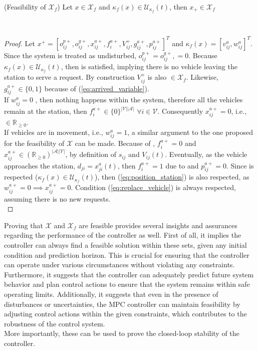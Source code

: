 \begin{proposition}{(Feasibility of $\mathcal{X}_f$)}\label{pro:feas_xf}
	Let $x \in \mathcal{X}_f$ and $\kappa_f(x) \in \mathcal{U}_{\kappa_f}(t)$, then $x_+\in \mathcal{X}_f$
\end{proposition}\\

\begin{proof}
 Let $x^+ = [o_{ij}^{p+}, o_{ij}^{g+}, x_{ij}^{a+}, f^{a+}_{i}, V_{ij}^{+}, g^{a+}_{ij}, p^{a+}_{ij}]^T$ and $\kappa_f(x) = [v^{a}_{ij}, w^{a}_{ij}]^T$. Since the system is treated as undisturbed, $o_{ij}^{p+}= o_{ij}^{g+},=0$. Because $\kappa_f(x) \in \mathcal{U}_{\kappa_f}(t)$, then  is satisfied, implying there is no vehicle leaving the station to serve a request. By construction $V_{ij}^{+}$ is also $\in \mathcal{X}_f$. Likewise, $g^{a+}_{ij}\in \{0,1\}$ because of (\ref{eq:arrived_variable}). \\
If $w^a_{ij} = 0$ , then nothing happens within the system, therefore all the vehicles remain at the station, then $ f^{a+}_{i} \in \{0\}^{|\mathcal{V}||\mathcal{A}|}$ $\forall i \in \mathcal{V}$. Consequently  $x_{ij}^{a+} = 0$, i.e., $\in \mathbb{R}_{\ge 0}$.\\
If vehicles are in movement, i.e., $w^a_{ij} = 1$, a similar argument to the one proposed for the feasibility of $\mathcal{X}$ can be made. Because of , $f^{a+}_{i}=0$ and $x_{ij}^{a+}\in (\mathbb{R}_{\ge 0})^{|\mathcal{A}||\mathcal{V}|}$, by definition of $s_{ij}$ and $V_{ij}(t)$. Eventually, as the vehicle approaches the station, $d_{ji} = x^a_{ji}(t)$, then $f^{a+}_{i}=1$ due to  and $p^{a+}_{ij}=0$. Since 
 is respected ($\kappa_f(x) \in \mathcal{U}_{\kappa_f}(t)$), then (\ref{eq:position_station}) is also respected, as $ w^{a+}_{ij}=0 \implies x_{ij}^{a+}=0$. Condition (\ref{eq:replace_vehicle}) is always respected, assuming there is no new requests. \\
\end{proof}
 Proving that $\mathcal{X}$ and $\mathcal{X}_f$ are feasible provides several insights and assurances regarding the performance of the controller as well. First of all, it implies the controller can always find a feasible solution within these sets, given any initial condition and prediction horizon. This is crucial for ensuring that the controller can operate under various circumstances without violating any constraints. Furthermore, it suggests that the controller can adequately predict future system behavior and plan control actions to ensure that the system remains within safe operating limits. Additionally, it suggests that even in the presence of disturbances or uncertainties, the MPC controller can maintain feasibility by adjusting control actions within the given constraints, which contributes to the robustness of the control system. \\
 More importantly, these can be used to prove the closed-loop stability of the controller. \\

